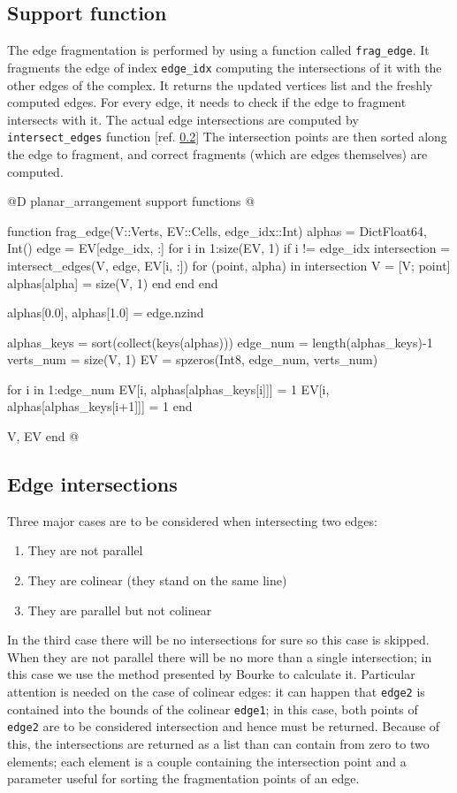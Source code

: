 \subsection{Support function}
\label{sec:frag_edge}
The edge fragmentation is performed by using a function called \texttt{frag\_edge}.
It fragments the edge of index \texttt{edge\_idx} computing the intersections of
it with the other edges of the complex. It returns the updated vertices list and the freshly computed edges.
For every edge, it needs to check if the edge to fragment intersects with it. 
The actual edge intersections are computed by \texttt{intersect\_edges} function [ref. \ref{sec:intersect_edges}]
The intersection points are then sorted along the edge to fragment, and correct fragments (which are edges themselves)
are computed.

@D planar\_arrangement support functions
@{function frag_edge(V::Verts, EV::Cells, edge_idx::Int)
    alphas = Dict{Float64, Int}()
    edge = EV[edge_idx, :]
    for i in 1:size(EV, 1)
        if i != edge_idx
            intersection = intersect_edges(V, edge, EV[i, :])
            for (point, alpha) in intersection
                V = [V; point]
                alphas[alpha] = size(V, 1)
            end
        end
    end

    alphas[0.0], alphas[1.0] = edge.nzind

    alphas_keys = sort(collect(keys(alphas)))
    edge_num = length(alphas_keys)-1
    verts_num = size(V, 1)
    EV = spzeros(Int8, edge_num, verts_num)

    for i in 1:edge_num
        EV[i, alphas[alphas_keys[i]]] = 1
        EV[i, alphas[alphas_keys[i+1]]] = 1
    end

    V, EV
end
@}
\subsection{Edge intersections}
\label{sec:intersect_edges}
Three major cases are to be considered when intersecting two edges:
\begin{enumerate}[noitemsep]
    \item They are not parallel
    \item They are colinear (they stand on the same line) 
    \item They are parallel but not colinear
\end{enumerate}
In the third case there will be no intersections for sure so this case is skipped.
When they are not parallel there will be no more than a single intersection; in this case
we use the method presented by Bourke\cite{Bourke} to calculate it.
Particular attention is needed on the case of colinear edges: it can happen
that \texttt{edge2} is contained into the bounds of the colinear \texttt{edge1}; in this case, both points of
\texttt{edge2} are to be considered intersection and hence must be returned. Because of this, 
the intersections are returned as a list than can contain from zero to two elements; 
each element is a couple containing the intersection
point and a parameter useful for sorting the fragmentation points of an edge.

